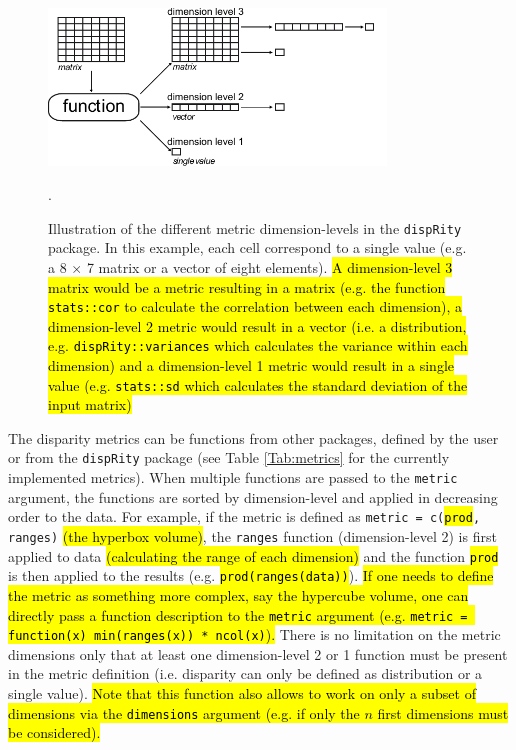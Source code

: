 \documentclass[12pt,letterpaper]{article}
\newcommand{\disp}{\texttt{dispRity} }
\begin{document}
\begin{figure}[!htbp]
\centering
   \includegraphics[width=0.8\textwidth]{../inst/gitbook/dispRity_fun.pdf} 
\caption{Illustration of the different metric dimension-levels in the \disp package. In this example, each cell correspond to a single value (e.g. a 8 $\times$ 7 matrix or a vector of eight elements).
\hl{A dimension-level 3 matrix would be a metric resulting in a matrix (e.g. the function \texttt{stats::cor} to calculate the correlation between each dimension), a dimension-level 2 metric would result in a vector (i.e. a distribution, e.g. \texttt{dispRity::variances} which calculates the variance within each dimension) and a dimension-level 1 metric would result in a single value (e.g. \texttt{stats::sd} which calculates the standard deviation of the input matrix)}}.
\label{Fig:levels}
\end{figure}

The disparity metrics can be functions from other packages, defined by the user or from the \disp package (see Table \ref{Tab:metrics} for the currently implemented metrics).
When multiple functions are passed to the \texttt{metric} argument, the functions are sorted by dimension-level and applied in decreasing order to the data.
For example, if the metric is defined as \texttt{metric = c(\hl{prod}, ranges)} \hl{(the hyperbox volume)}, the \texttt{ranges} function (dimension-level 2) is first applied to data \hl{(calculating the range of each dimension)} and the function \hl{\texttt{prod}} is then applied to the results (e.g. \hl{\texttt{prod(ranges(data))}}).
\hl{If one needs to define the metric as something more complex, say the hypercube volume, one can directly pass a function description to the \texttt{metric} argument (e.g. \texttt{metric = function(x) min(ranges(x)) * ncol(x)}).}
There is no limitation on the metric dimensions only that at least one dimension-level 2 or 1 function must be present in the metric definition (i.e. disparity can only be defined as distribution or a single value).
\hl{Note that this function also allows to work on only a subset of dimensions via the \texttt{dimensions} argument (e.g. if only the $n$ first dimensions must be considered).}
\end{document}
